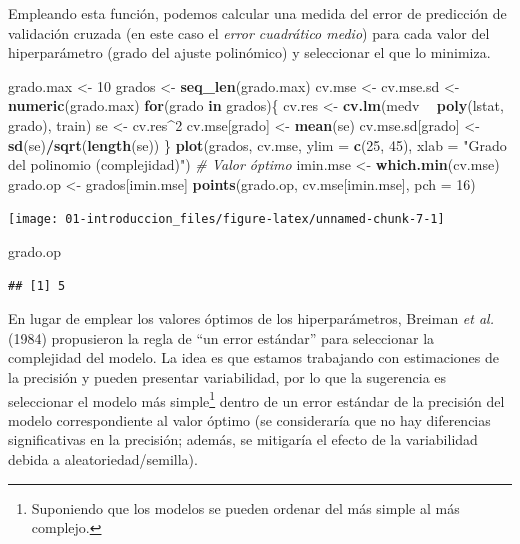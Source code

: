 \documentclass[
]{book}
\newenvironment{Shaded}{\begin{snugshade}}{\end{snugshade}}
\newcommand{\CommentTok}[1]{\textcolor[rgb]{0.56,0.35,0.01}{\textit{#1}}}
\newcommand{\ControlFlowTok}[1]{\textcolor[rgb]{0.13,0.29,0.53}{\textbf{#1}}}
\newcommand{\DataTypeTok}[1]{\textcolor[rgb]{0.13,0.29,0.53}{#1}}
\newcommand{\DecValTok}[1]{\textcolor[rgb]{0.00,0.00,0.81}{#1}}
\newcommand{\KeywordTok}[1]{\textcolor[rgb]{0.13,0.29,0.53}{\textbf{#1}}}
\newcommand{\NormalTok}[1]{#1}
\newcommand{\OperatorTok}[1]{\textcolor[rgb]{0.81,0.36,0.00}{\textbf{#1}}}
\newcommand{\StringTok}[1]{\textcolor[rgb]{0.31,0.60,0.02}{#1}}
\theoremstyle{break}
\theoremstyle{definition}
\theoremstyle{definition}
\theoremstyle{definition}
\theoremstyle{remark}
\begin{document}
Empleando esta función, podemos calcular una medida del error de predicción de validación cruzada (en este caso el \emph{error cuadrático medio}) para cada valor del hiperparámetro (grado del ajuste polinómico) y seleccionar el que lo minimiza.

\begin{Shaded}
\begin{Highlighting}[]
\NormalTok{grado.max <-}\StringTok{ }\DecValTok{10}
\NormalTok{grados <-}\StringTok{ }\KeywordTok{seq_len}\NormalTok{(grado.max) }
\NormalTok{cv.mse <-}\StringTok{ }\NormalTok{cv.mse.sd <-}\StringTok{ }\KeywordTok{numeric}\NormalTok{(grado.max)}
\ControlFlowTok{for}\NormalTok{(grado }\ControlFlowTok{in}\NormalTok{ grados)\{}
\NormalTok{  cv.res <-}\StringTok{ }\KeywordTok{cv.lm}\NormalTok{(medv }\OperatorTok{~}\StringTok{ }\KeywordTok{poly}\NormalTok{(lstat, grado), train)}
\NormalTok{  se <-}\StringTok{ }\NormalTok{cv.res}\OperatorTok{^}\DecValTok{2}
\NormalTok{  cv.mse[grado] <-}\StringTok{ }\KeywordTok{mean}\NormalTok{(se)}
\NormalTok{  cv.mse.sd[grado] <-}\StringTok{ }\KeywordTok{sd}\NormalTok{(se)}\OperatorTok{/}\KeywordTok{sqrt}\NormalTok{(}\KeywordTok{length}\NormalTok{(se))}
\NormalTok{\}}
\KeywordTok{plot}\NormalTok{(grados, cv.mse, }\DataTypeTok{ylim =} \KeywordTok{c}\NormalTok{(}\DecValTok{25}\NormalTok{, }\DecValTok{45}\NormalTok{),}
  \DataTypeTok{xlab =} \StringTok{"Grado del polinomio (complejidad)"}\NormalTok{)}
\CommentTok{# Valor óptimo}
\NormalTok{imin.mse <-}\StringTok{ }\KeywordTok{which.min}\NormalTok{(cv.mse)}
\NormalTok{grado.op <-}\StringTok{ }\NormalTok{grados[imin.mse]}
\KeywordTok{points}\NormalTok{(grado.op, cv.mse[imin.mse], }\DataTypeTok{pch =} \DecValTok{16}\NormalTok{)}
\end{Highlighting}
\end{Shaded}

\begin{center}\texttt{[image: 01-introduccion\_files/figure-latex/unnamed-chunk-7-1]} \end{center}

\begin{Shaded}
\begin{Highlighting}[]
\NormalTok{grado.op}
\end{Highlighting}
\end{Shaded}

\begin{verbatim}
## [1] 5
\end{verbatim}

En lugar de emplear los valores óptimos de los hiperparámetros, Breiman \emph{et al.} (1984) propusieron la regla de ``un error estándar'' para seleccionar la complejidad del modelo.
La idea es que estamos trabajando con estimaciones de la precisión y pueden presentar variabilidad,
por lo que la sugerencia es seleccionar el modelo más simple\footnote{Suponiendo que los modelos se pueden ordenar del más simple al más complejo.} dentro de un error estándar de la precisión del modelo correspondiente al valor óptimo
(se consideraría que no hay diferencias significativas en la precisión;
además, se mitigaría el efecto de la variabilidad debida a aleatoriedad/semilla).
\end{document}
